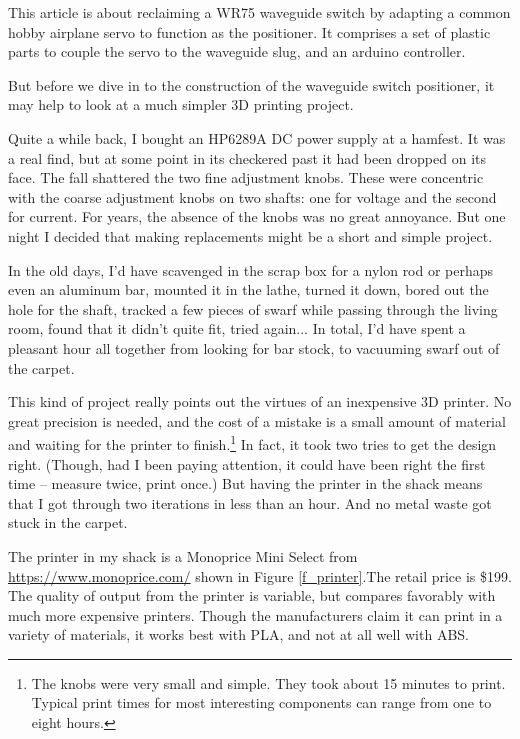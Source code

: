 \documentclass[12pt]{article}
\begin{document}
This article is about reclaiming a WR75 waveguide switch by adapting
a common hobby airplane servo to function as the positioner. It comprises
a set of plastic parts to couple the servo to the waveguide slug,
and an arduino controller.

But before we dive in to the construction of the waveguide switch positioner,
it may help to look at a much simpler 3D printing project.

Quite a while back, I bought an HP6289A DC power supply at a hamfest.
It was a real find, but at some point in its checkered past it had
been dropped on its face.  The fall shattered the two fine adjustment
knobs.  These were concentric with the coarse adjustment knobs on two
shafts: one for voltage and the second for current.  For years, the
absence of the knobs was no great annoyance. But one night I decided
that making replacements might be a short and simple project.

In the old days, I'd have scavenged in the scrap box for a nylon rod
or perhaps even an aluminum bar, mounted it in the lathe, turned it down,
bored out the hole for the shaft, tracked a few pieces of swarf while
passing through the living room, found that it didn't quite fit, tried
again... In total, I'd have spent a pleasant hour all together from
looking for bar stock, to vacuuming swarf out of the carpet.

This kind of project really points out the virtues of an inexpensive
3D printer.  No great precision is needed, and the cost of a mistake
is a small amount of material and  waiting for the
printer to finish.\footnote{The knobs were very small and simple. They
  took about 15 minutes to print. Typical
  print times for most interesting components can range from one to
  eight hours.}
In fact, it took two tries to get the design right. (Though, had I
been paying attention, it could have been right the first time --
measure twice, print once.) But having the printer in the shack
means that I got through two iterations in less than an hour.
And no metal waste got stuck in the carpet. 


The printer in my shack is a Monoprice Mini Select from \url{https://www.monoprice.com/} shown in Figure \ref{f_printer}.The retail price is \$199. The quality of output from the printer
is variable, but compares favorably with much more expensive printers. Though
the manufacturers claim it can print in a variety of materials, it works best
with PLA, and not at all well with ABS.
\end{document}
